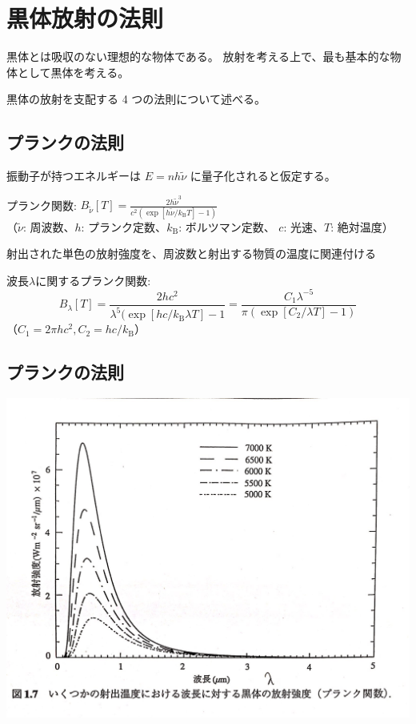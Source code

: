 \documentclass[article]{dennou777}
\begin{document}
\section{黒体放射の法則}

黒体とは吸収のない理想的な物体である。
放射を考える上で、最も基本的な物体として黒体を考える。

黒体の放射を支配する 4 つの法則について述べる。

\subsection{プランクの法則}
振動子が持つエネルギーは $E=nh\tilde{\nu}$ に量子化されると仮定する。

プランク関数: $\displaystyle B_{\tilde{\nu}}[T]=\frac{2h\tilde{\nu}^3}{c^2(\exp[h\tilde{\nu}/k_\mathrm{B}T]-1)}$\\
{\scriptsize （$\tilde{\nu}$: 周波数、$h$: プランク定数、$k_\mathrm{B}$: ボルツマン定数、
$c$: 光速、$T$: 絶対温度）}

射出された単色の放射強度を、周波数と射出する物質の温度に関連付ける

波長$\lambda$に関するプランク関数:
\[B_\lambda[T]=\frac{2hc^2}{\lambda^5(\exp[hc/k_\mathrm{B}\lambda T]-1}=
	\frac{C_1\lambda^{-5}}{\pi(\exp[C_2/\lambda T]-1)}\]
{\scriptsize （$C_1=2\pi hc^2, C_2=hc/k_\mathrm{B}$）}

\subsection{プランクの法則}
\includegraphics[width=\textwidth]{planck.jpg}
\end{document}
